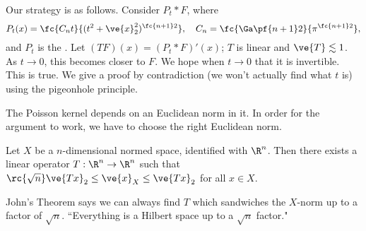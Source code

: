 Our strategy is as follows. Consider $P_t*F$, where 
\[
P_t(x)=\fc{C_nt}{(t^2+\ve{x}_2^2)^{\fc{n+1}2}}, \quad C_n=\fc{\Ga\pf{n+1}2}{\pi^{\fc{n+1}2}},
\]
and $P_t$ is the . 
Let $(TF)(x)=(P_t*F)'(x)$; $T$ is linear and $\ve{T}\lesssim 1$. As $t\to 0$, this becomes closer to $F$. We hope when $t\to 0$ that it is invertible. This is true. We give a proof by contradiction (we won't actually find what $t$ is) using the pigeonhole principle. %

The Poisson kernel depends on an Euclidean norm in it. 
In order for the argument to work, we have to choose the right Euclidean norm.

\begin{thm}
Let $X$ be a $n$-dimensional normed space, identified with $\R^n$. Then there exists a linear operator $T:\R^n\to \R^n$ such that $\rc{\sqrt{n}}\ve{Tx}_2\le \ve{x}_X \le \ve{Tx}_2$ for all $x\in X$.
\end{thm}
John's Theorem says we can always find $T$ which sandwiches the $X$-norm up to a factor of $\sqrt n$. 
``Everything is a Hilbert space up to a $\sqrt n$ factor."


